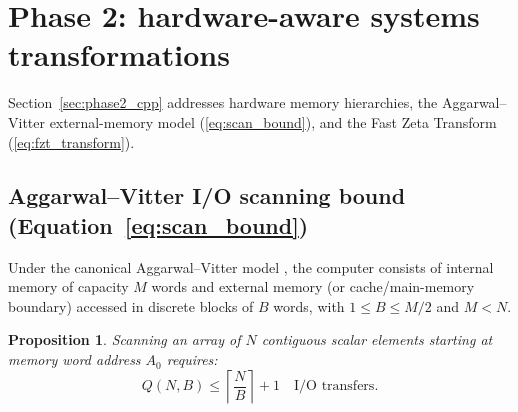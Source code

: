 \documentclass[11pt, letterpaper]{article}
\newtheorem{proposition}{Proposition}[section]
\begin{document}
\section{Phase 2: hardware-aware systems transformations}
Section~\ref{sec:phase2_cpp} addresses hardware memory hierarchies, the Aggarwal--Vitter external-memory model (\ref{eq:scan_bound}), and the Fast Zeta Transform (\ref{eq:fzt_transform}).

\subsection{Aggarwal--Vitter I/O scanning bound (\texorpdfstring{Equation~\ref{eq:scan_bound}}{Eq. 4})}
Under the canonical Aggarwal--Vitter model \cite{aggarwal1988input}, the computer consists of internal memory of capacity $M$ words and external memory (or cache/main-memory boundary) accessed in discrete blocks of $B$ words, with $1 \le B \le M/2$ and $M < N$.

\begin{proposition}
Scanning an array of $N$ contiguous scalar elements starting at memory word address $A_0$ requires:
\begin{equation}
    Q(N, B) \le \left\lceil \frac{N}{B} \right\rceil + 1 \quad \text{I/O transfers}.
\end{equation}
\end{proposition}
\end{document}
